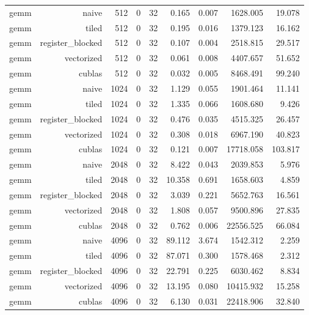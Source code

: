 \begin{longtable}{lrrrrrrrr}
gemm & naive & 512 & 0 & 32 & 0.165 & 0.007 & 1628.005 & 19.078 \\
gemm & tiled & 512 & 0 & 32 & 0.195 & 0.016 & 1379.123 & 16.162 \\
gemm & register\_blocked & 512 & 0 & 32 & 0.107 & 0.004 & 2518.815 & 29.517 \\
gemm & vectorized & 512 & 0 & 32 & 0.061 & 0.008 & 4407.657 & 51.652 \\
gemm & cublas & 512 & 0 & 32 & 0.032 & 0.005 & 8468.491 & 99.240 \\
gemm & naive & 1024 & 0 & 32 & 1.129 & 0.055 & 1901.464 & 11.141 \\
gemm & tiled & 1024 & 0 & 32 & 1.335 & 0.066 & 1608.680 & 9.426 \\
gemm & register\_blocked & 1024 & 0 & 32 & 0.476 & 0.035 & 4515.325 & 26.457 \\
gemm & vectorized & 1024 & 0 & 32 & 0.308 & 0.018 & 6967.190 & 40.823 \\
gemm & cublas & 1024 & 0 & 32 & 0.121 & 0.007 & 17718.058 & 103.817 \\
gemm & naive & 2048 & 0 & 32 & 8.422 & 0.043 & 2039.853 & 5.976 \\
gemm & tiled & 2048 & 0 & 32 & 10.358 & 0.691 & 1658.603 & 4.859 \\
gemm & register\_blocked & 2048 & 0 & 32 & 3.039 & 0.221 & 5652.763 & 16.561 \\
gemm & vectorized & 2048 & 0 & 32 & 1.808 & 0.057 & 9500.896 & 27.835 \\
gemm & cublas & 2048 & 0 & 32 & 0.762 & 0.006 & 22556.525 & 66.084 \\
gemm & naive & 4096 & 0 & 32 & 89.112 & 3.674 & 1542.312 & 2.259 \\
gemm & tiled & 4096 & 0 & 32 & 87.071 & 0.300 & 1578.468 & 2.312 \\
gemm & register\_blocked & 4096 & 0 & 32 & 22.791 & 0.225 & 6030.462 & 8.834 \\
gemm & vectorized & 4096 & 0 & 32 & 13.195 & 0.080 & 10415.932 & 15.258 \\
gemm & cublas & 4096 & 0 & 32 & 6.130 & 0.031 & 22418.906 & 32.840 \\
\end{longtable}
